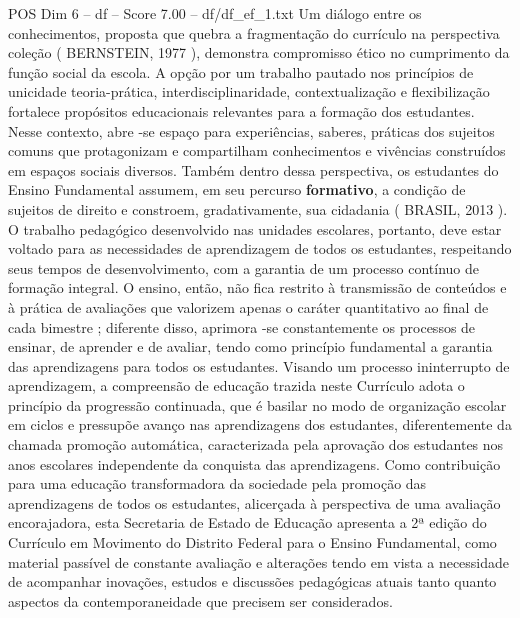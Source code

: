 \begin{textsample}{POS Dim 6 – df – Score 7.00 – df/df\_ef\_1.txt}
Um diálogo entre os conhecimentos, proposta que quebra a fragmentação do currículo na perspectiva coleção ( BERNSTEIN, 1977 ), demonstra compromisso ético no cumprimento da função social da escola.
A opção por um trabalho pautado nos princípios de unicidade teoria-prática, interdisciplinaridade, contextualização e flexibilização fortalece propósitos educacionais relevantes para a formação dos estudantes.
Nesse contexto, abre -se espaço para experiências, saberes, práticas dos sujeitos comuns que protagonizam e compartilham conhecimentos e vivências construídos em espaços sociais diversos.
Também dentro dessa perspectiva, os estudantes do Ensino Fundamental assumem, em seu percurso \textbf{formativo}, a condição de sujeitos de direito e constroem, gradativamente, sua cidadania ( BRASIL, 2013 ).
O trabalho pedagógico desenvolvido nas unidades escolares, portanto, deve estar voltado para as necessidades de aprendizagem de todos os estudantes, respeitando seus tempos de desenvolvimento, com a garantia de um processo contínuo de formação integral.
O ensino, então, não fica restrito à transmissão de conteúdos e à prática de avaliações que valorizem apenas o caráter quantitativo ao final de cada bimestre ; diferente disso, aprimora -se constantemente os processos de ensinar, de aprender e de avaliar, tendo como princípio fundamental a garantia das aprendizagens para todos os estudantes.
Visando um processo ininterrupto de aprendizagem, a compreensão de educação trazida neste Currículo adota o princípio da progressão continuada, que é basilar no modo de organização escolar em ciclos e pressupõe avanço nas aprendizagens dos estudantes, diferentemente da chamada promoção automática, caracterizada pela aprovação dos estudantes nos anos escolares independente da conquista das aprendizagens.
Como contribuição para uma educação transformadora da sociedade pela promoção das aprendizagens de todos os estudantes, alicerçada à perspectiva de uma avaliação encorajadora, esta Secretaria de Estado de Educação apresenta a 2ª edição do Currículo em Movimento do Distrito Federal para o Ensino Fundamental, como material passível de constante avaliação e alterações tendo em vista a necessidade de acompanhar inovações, estudos e discussões pedagógicas atuais tanto quanto aspectos da contemporaneidade que precisem ser considerados.

\end{textsample}
